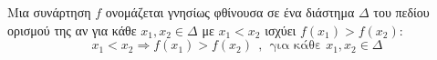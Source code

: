 Μια συνάρτηση $ f $  ονομάζεται γνησίως φθίνουσα σε ένα διάστημα $\Delta $ του πεδίου ορισμού της αν για κάθε $ x_1,x_2\in\Delta $ με $ x_1<x_2 $ ισχύει $ f(x_1)>f(x_2) $:
\[ x_1<x_2\Rightarrow f(x_1)>f(x_2)\ \ ,\ \ \textrm{για κάθε }x_1,x_2\in\mathbb{\varDelta} \]
